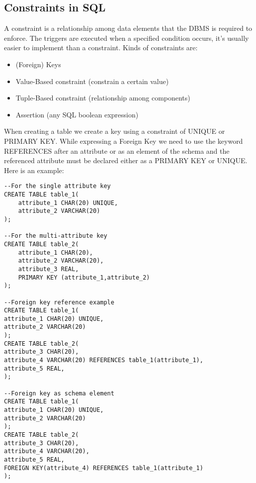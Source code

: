 \documentclass[a4page, 11pt]{article}
\begin{document}
\subsection{Constraints in SQL}
A constraint is a relationship among data elements that the DBMS is required to enforce. The triggers are executed when a specified condition occurs, it's usually easier to implement than a constraint. 
Kinds of constraints are:
\begin{itemize}[noitemsep]
	\item (Foreign) Keys
	\item Value-Based constraint (constrain a certain value)
	\item Tuple-Based constraint (relationship among components)
	\item Assertion (any SQL boolean expression)
\end{itemize}
When creating a table we create a key using a constraint of UNIQUE or PRIMARY KEY. While expressing a Foreign Key we need to use the keyword REFERENCES after an attribute or as an element of the schema and the referenced attribute must be declared either as a PRIMARY KEY or UNIQUE. Here is an example:
\begin{lstlisting}
--For the single attribute key
CREATE TABLE table_1(
	attribute_1 CHAR(20) UNIQUE,
	attribute_2 VARCHAR(20)
);

--For the multi-attribute key
CREATE TABLE table_2(
	attribute_1 CHAR(20),
	attribute_2 VARCHAR(20),
	attribute_3 REAL,
	PRIMARY KEY (attribute_1,attribute_2)
);

--Foreign key reference example
CREATE TABLE table_1(
attribute_1 CHAR(20) UNIQUE,
attribute_2 VARCHAR(20)
);
CREATE TABLE table_2(
attribute_3 CHAR(20),
attribute_4 VARCHAR(20) REFERENCES table_1(attribute_1),
attribute_5 REAL,
);

--Foreign key as schema element
CREATE TABLE table_1(
attribute_1 CHAR(20) UNIQUE,
attribute_2 VARCHAR(20)
);
CREATE TABLE table_2(
attribute_3 CHAR(20),
attribute_4 VARCHAR(20),
attribute_5 REAL,
FOREIGN KEY(attribute_4) REFERENCES table_1(attribute_1)
);
\end{lstlisting}
\end{document}
